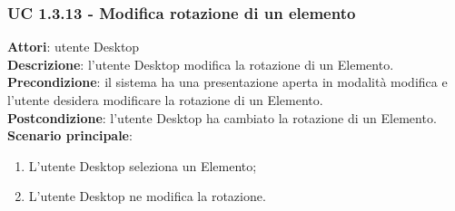\subsubsection{UC 1.3.13 - Modifica rotazione di un elemento}{
	\label{uc1.3.13}
	\textbf{Attori}: utente Desktop \\
	\textbf{Descrizione}: l'utente Desktop modifica la rotazione di un Elemento. \\
	\textbf{Precondizione}: il sistema ha una presentazione aperta in modalità modifica e l'utente desidera modificare la rotazione di un Elemento.	\\
	\textbf{Postcondizione}: l'utente Desktop ha cambiato la rotazione di un Elemento.	\\
	\textbf{Scenario principale}:
	\begin{enumerate}
		\item L'utente Desktop seleziona un Elemento;
		\item L'utente Desktop ne modifica la rotazione.
	\end{enumerate}
	}
